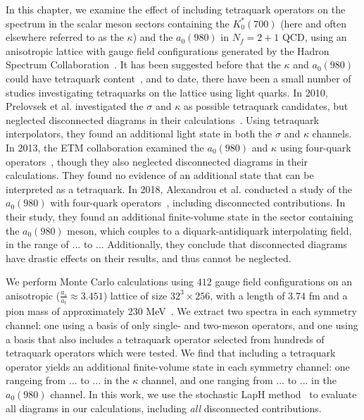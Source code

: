 In this chapter, we examine the effect of including tetraquark operators on the spectrum in the scalar meson sectors containing the $K_0^*(700)$ (here and often elsewhere referred to as the $\kappa$) and the $a_0(980)$ in $N_f = 2 + 1$ QCD, using an anisotropic lattice with gauge field configurations generated by the Hadron Spectrum Collaboration~\cite{Edwards:2008ja}. It has been suggested before that the $\kappa$ and $a_0(980)$ could have tetraquark content~\cite{Jaffe:2004ph, Amsler:2004ps, Close:2002zu, Maiani:2004uc}, and to date, there have been a small number of studies investigating tetraquarks on the lattice using light quarks. In 2010, Prelovsek et al. investigated the $\sigma$ and $\kappa$ as possible tetraquark candidates, but neglected disconnected diagrams in their calculations~\cite{Prelovsek:2010kg}. Using tetraquark interpolators, they found an additional light state in both the $\sigma$ and $\kappa$ channels. In 2013, the ETM collaboration examined the $a_0(980)$ and $\kappa$ using four-quark operators~\cite{Alexandrou:2012rm}, though they also neglected disconnected diagrams in their calculations. They found no evidence of an additional state that can be interpreted as a tetraquark. In 2018, Alexandrou et al. conducted a study of the $a_0(980)$ with four-quark operators~\cite{Alexandrou:2017itd}, including disconnected contributions. In their study, they found an additional finite-volume state in the sector containing the $a_0(980)$ meson, which couples to a diquark-antidiquark interpolating field, in the range of ... to ... Additionally, they conclude that disconnected diagrams have drastic effects on their results, and thus cannot be neglected.

We perform Monte Carlo calculations using $412$ gauge field configurations on an anisotropic ($\frac{a_s}{a_t} \approx 3.451$) lattice of size $32^3\times 256$, with a length of $3.74$ fm and a pion mass of approximately $230$ MeV~\cite{}. We extract two spectra in each symmetry channel: one using a basis of only single- and two-meson operators, and one using a basis that also includes a tetraquark operator selected from hundreds of tetraquark operators which were tested. We find that including a tetraquark operator yields an additional finite-volume state in each symmetry channel: one rangeing from ... to ... in the $\kappa$ channel, and one ranging from ... to ... in the $a_0(980)$ channel. In this work, we use the stochastic LapH method~\cite{slaph} to evaluate all diagrams in our calculations, including \textit{all} disconnected contributions.

